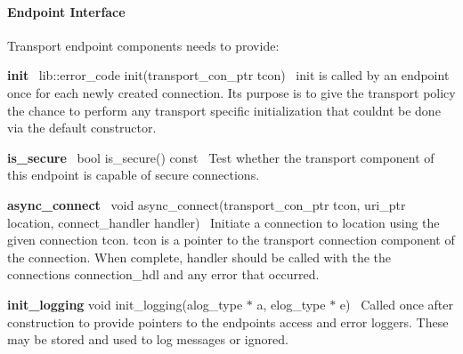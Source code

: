 \paragraph*{Endpoint Interface}

Transport endpoint components needs to provide\+:

{\bfseries init}~\newline
{\ttfamily lib\+::error\+\_\+code init(transport\+\_\+con\+\_\+ptr tcon)}~\newline
init is called by an endpoint once for each newly created connection. It\textquotesingle{}s purpose is to give the transport policy the chance to perform any transport specific initialization that couldn\textquotesingle{}t be done via the default constructor.

{\bfseries is\+\_\+secure}~\newline
{\ttfamily bool is\+\_\+secure() const}~\newline
Test whether the transport component of this endpoint is capable of secure connections.

{\bfseries async\+\_\+connect}~\newline
{\ttfamily void async\+\_\+connect(transport\+\_\+con\+\_\+ptr tcon, uri\+\_\+ptr location, connect\+\_\+handler handler)}~\newline
Initiate a connection to {\ttfamily location} using the given connection {\ttfamily tcon}. {\ttfamily tcon} is a pointer to the transport connection component of the connection. When complete, {\ttfamily handler} should be called with the the connection\textquotesingle{}s {\ttfamily connection\+\_\+hdl} and any error that occurred.

{\bfseries init\+\_\+logging} {\ttfamily void init\+\_\+logging(alog\+\_\+type $\ast$ a, elog\+\_\+type $\ast$ e)}~\newline
Called once after construction to provide pointers to the endpoint\textquotesingle{}s access and error loggers. These may be stored and used to log messages or ignored. 